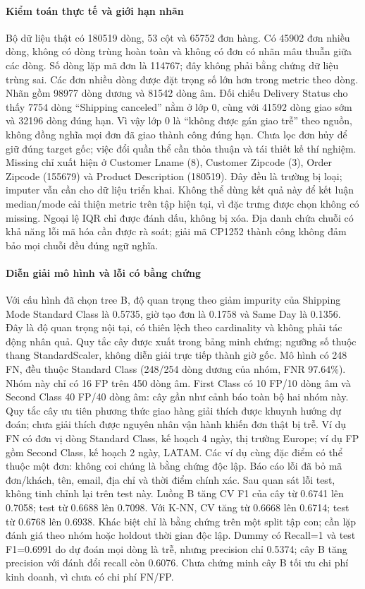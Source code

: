 ﻿\paragraph{Kiểm toán thực tế và giới hạn nhãn}
Bộ dữ liệu thật có 180519 dòng, 53 cột và 65752 đơn hàng. Có 45902 đơn nhiều dòng, không có dòng trùng hoàn toàn và không có đơn có nhãn mâu thuẫn giữa các dòng. Số dòng lặp mã đơn là 114767; đây không phải bằng chứng dữ liệu trùng sai. Các đơn nhiều dòng được đặt trọng số lớn hơn trong metric theo dòng.
Nhãn gồm 98977 dòng dương và 81542 dòng âm. Đối chiếu Delivery Status cho thấy 7754 dòng ``Shipping canceled'' nằm ở lớp 0, cùng với 41592 dòng giao sớm và 32196 dòng đúng hạn. Vì vậy lớp 0 là ``không được gán giao trễ'' theo nguồn, không đồng nghĩa mọi đơn đã giao thành công đúng hạn. Chưa lọc đơn hủy để giữ đúng target gốc; việc đổi quần thể cần thỏa thuận và tái thiết kế thí nghiệm.
Missing chỉ xuất hiện ở Customer Lname (8), Customer Zipcode (3), Order Zipcode (155679) và Product Description (180519). Đây đều là trường bị loại; imputer vẫn cần cho dữ liệu triển khai. Không thể dùng kết quả này để kết luận median/mode cải thiện metric trên tập hiện tại, vì đặc trưng được chọn không có missing. Ngoại lệ IQR chỉ được đánh dấu, không bị xóa. Địa danh chứa chuỗi có khả năng lỗi mã hóa cần được rà soát; giải mã CP1252 thành công không đảm bảo mọi chuỗi đều đúng ngữ nghĩa.
\paragraph{Diễn giải mô hình và lỗi có bằng chứng}
Với cấu hình đã chọn tree B, độ quan trọng theo giảm impurity của Shipping Mode Standard Class là 0.5735, giờ tạo đơn là 0.1758 và Same Day là 0.1356. Đây là độ quan trọng nội tại, có thiên lệch theo cardinality và không phải tác động nhân quả. Quy tắc cây được xuất trong bảng minh chứng; ngưỡng số thuộc thang StandardScaler, không diễn giải trực tiếp thành giờ gốc.
Mô hình có 248 FN, đều thuộc Standard Class (248/254 dòng dương của nhóm, FNR 97.64\%). Nhóm này chỉ có 16 FP trên 450 dòng âm. First Class có 10 FP/10 dòng âm và Second Class 40 FP/40 dòng âm: cây gần như cảnh báo toàn bộ hai nhóm này. Quy tắc cây ưu tiên phương thức giao hàng giải thích được khuynh hướng dự đoán; chưa giải thích được nguyên nhân vận hành khiến đơn thật bị trễ.
Ví dụ FN có đơn vị dòng Standard Class, kế hoạch 4 ngày, thị trường Europe; ví dụ FP gồm Second Class, kế hoạch 2 ngày, LATAM. Các ví dụ cùng đặc điểm có thể thuộc một đơn: không coi chúng là bằng chứng độc lập. Báo cáo lỗi đã bỏ mã đơn/khách, tên, email, địa chỉ và thời điểm chính xác. Sau quan sát lỗi test, không tinh chỉnh lại trên test này.
Luồng B tăng CV F1 của cây từ 0.6741 lên 0.7058; test từ 0.6688 lên 0.7098. Với K-NN, CV tăng từ 0.6668 lên 0.6714; test từ 0.6768 lên 0.6938. Khác biệt chỉ là bằng chứng trên một split tập con; cần lặp đánh giá theo nhóm hoặc holdout thời gian độc lập. Dummy có Recall=1 và test F1=0.6991 do dự đoán mọi dòng là trễ, nhưng precision chỉ 0.5374; cây B tăng precision với đánh đổi recall còn 0.6076. Chưa chứng minh cây B tối ưu chi phí kinh doanh, vì chưa có chi phí FN/FP.
